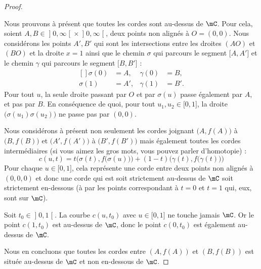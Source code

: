 \begin{proof}
\begin{subproof}
    \end{subproof}

    Nous prouvons à présent que toutes les cordes sont au-dessus de \( \mC\). Pour cela, soient \( A,B\in \mathopen] 0 , \infty \mathclose[\times \mathopen] 0 , \infty \mathclose[\), deux points non alignés à \( O=(0,0)\). Nous considérons les points \( A',B'\) qui sont les intersections entre les droites \( (AO)\) et \( (BO)\) et la droite \( x=1\) ainsi que le chemin \( \sigma\) qui parcours le segment \( \mathopen[ A , A' \mathclose]\) et le chemin \( \gamma\) qui parcours le segment \( \mathopen[ B , B' \mathclose]\) :
    \begin{equation}
        \begin{aligned}[]
            \sigma(0)&=A,&\gamma(0)&=B,\\
            \sigma(1)&=A',&\gamma(1)&=B'.
        \end{aligned}
    \end{equation}
    Pour tout \( u\), la seule droite passant par \( O\) et par \( \sigma(u)\) passe également par \( A\), et pas par \( B\). En conséquence de quoi, pour tout \( u_1,u_2\in \mathopen[ 0 , 1 \mathclose]\), la droite \( \big( \sigma(u_1)\sigma(u_2) \big)\) ne passe pas par \( (0,0)\).

    Nous considérons à présent non seulement les cordes joignant \( \big( A,f(A) \big)\) à \( \big( B,f(B) \big)\) et \( \big( A',f(A') \big)\) à \( \big( B',f(B') \big)\) mais également toutes les cordes intermédiaires (si vous aimez les gros mots, vous pouvez parler d'homotopie) :
    \begin{equation}
        c(u,t)=t\Big( \sigma(t), f\big(\sigma(u)\big) \Big)+(1-t)\Big( \gamma(t),f\big( \gamma(t) \big) \Big)
    \end{equation}
    Pour chaque \( u\in\mathopen[ 0 , 1 \mathclose]\), cela représente une corde entre deux points non alignés à \( (0,0,0)\) et donc une corde qui est soit strictement au-dessus de \( \mC\) soit strictement en-dessous (à par les points correspondant à \( t=0\) et \( t=1\) qui, eux, sont sur \( \mC\)).

    Soit \( t_0\in \mathopen] 0 , 1 \mathclose[\). La courbe \( c(u,t_0)\) avec \( u\in\mathopen[ 0 , 1 \mathclose]\) ne touche jamais \( \mC\). Or le point \( c(1,t_0)\) est au-dessus de \( \mC\), donc le point \( c(0,t_0)\) est également au-dessus de \( \mC\).

    Nous en concluons que toutes les cordes entre \( (A,f(A)) \) et \( (B,f(B))\) est située au-dessus de \( \mC\) et non en-dessous de \( \mC\).

\end{proof}

